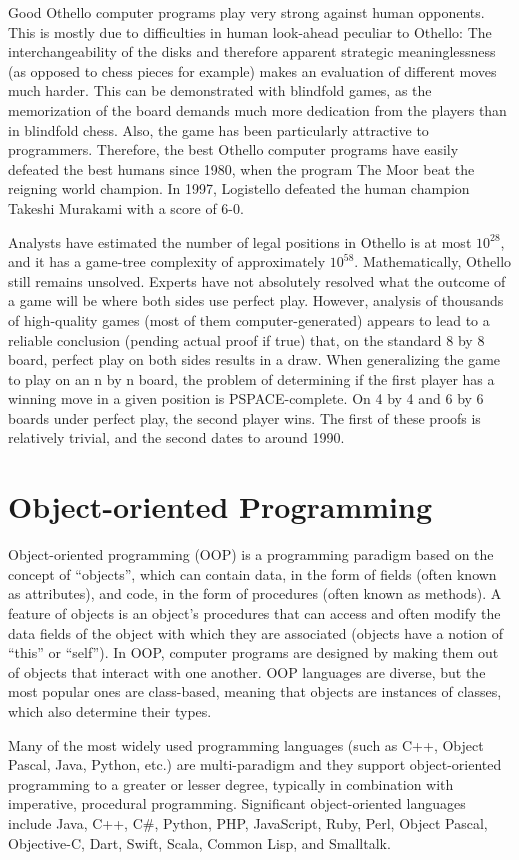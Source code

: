 \documentclass[a4paper]{report}
\begin{document}
Good Othello computer programs play very strong against human opponents. This is mostly due to difficulties in human look-ahead peculiar to Othello: The interchangeability of the disks and therefore apparent strategic meaninglessness (as opposed to chess pieces for example) makes an evaluation of different moves much harder. This can be demonstrated with blindfold games, as the memorization of the board demands much more dedication from the players than in blindfold chess. Also, the game has been particularly attractive to programmers. Therefore, the best Othello computer programs have easily defeated the best humans since 1980, when the program The Moor beat the reigning world champion. In 1997, Logistello defeated the human champion Takeshi Murakami with a score of 6-0. 
\par
Analysts have estimated the number of legal positions in Othello is at most $10^28$, and it has a game-tree complexity of approximately $10^58$. Mathematically, Othello still remains unsolved. Experts have not absolutely resolved what the outcome of a game will be where both sides use perfect play. However, analysis of thousands of high-quality games (most of them computer-generated) appears to lead to a reliable conclusion (pending actual proof if true) that, on the standard 8 by 8 board, perfect play on both sides results in a draw. When generalizing the game to play on an n by n board, the problem of determining if the first player has a winning move in a given position is PSPACE-complete. On 4 by 4 and 6 by 6 boards under perfect play, the second player wins. The first of these proofs is relatively trivial, and the second dates to around 1990. 

\section{Object-oriented Programming}
Object-oriented programming (OOP) is a programming paradigm based on the concept of ``objects'', which can contain data, in the form of fields (often known as attributes), and code, in the form of procedures (often known as methods). A feature of objects is an object's procedures that can access and often modify the data fields of the object with which they are associated (objects have a notion of ``this'' or ``self''). In OOP, computer programs are designed by making them out of objects that interact with one another. OOP languages are diverse, but the most popular ones are class-based, meaning that objects are instances of classes, which also determine their types. 
\par
Many of the most widely used programming languages (such as C++, Object Pascal, Java, Python, etc.) are multi-paradigm and they support object-oriented programming to a greater or lesser degree, typically in combination with imperative, procedural programming. Significant object-oriented languages include Java, C++, C\#, Python, PHP, JavaScript, Ruby, Perl, Object Pascal, Objective-C, Dart, Swift, Scala, Common Lisp, and Smalltalk. 
\end{document}
